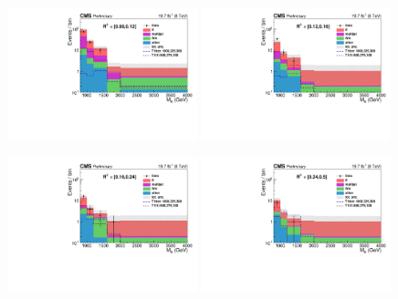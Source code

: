 \begin{figure}[htpb]
\centering
\includegraphics[width=0.49\textwidth]{figures/razor_results/bg_prediction_plot_R2bin0}
\includegraphics[width=0.49\textwidth]{figures/razor_results/bg_prediction_plot_R2bin1}

\includegraphics[width=0.49\textwidth]{figures/razor_results/bg_prediction_plot_R2bin2}
\includegraphics[width=0.49\textwidth]{figures/razor_results/bg_prediction_plot_R2bin3}


\end{figure}
